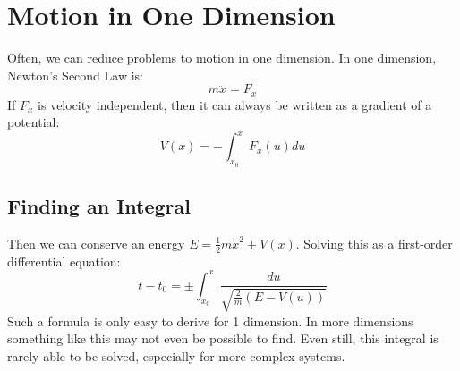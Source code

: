 \documentclass[../Main.tex]{subfiles}
\begin{document}
\section{Motion in One Dimension}
Often, we can reduce problems to motion in one dimension. In one dimension, Newton's Second Law is:
\begin{equation}
    m\ddot{x} = F_x
    \label{eqnNewtonSecondOneDim}
\end{equation}
If $F_x$ is velocity independent, then it can always be written as a gradient of a potential:
\begin{equation}
    V(x) = -\int_{x_0}^{x} F_x(u) du
    \label{eqnPotentialOneDim}
\end{equation}
\subsection{Finding an Integral}
Then we can conserve an energy $E = \frac{1}{2} m \dot{x}^2 + V(x)$. Solving this as a first-order differential equation:
\begin{equation}
    t - t_0 = \pm \int_{x_0}^x \frac{du}{\sqrt{\frac{2}{m}\left(E - V(u)\right)}}
    \label{eqnTimeGivenEnergy}
\end{equation}
Such a formula is only easy to derive for 1 dimension. In more dimensions something like this may not even be possible to find. Even still, this integral is rarely able to be solved, especially for more complex systems.
\end{document}
